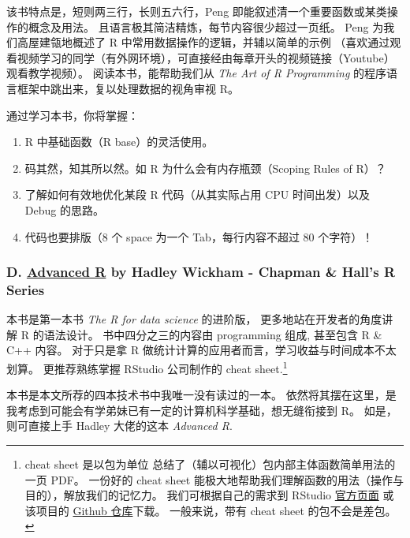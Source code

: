 \documentclass[11pt,hyperref]{ctexart}
\begin{document}
该书特点是，短则两三行，长则五六行，Peng
即能叙述清一个重要函数或某类操作的概念及用法。
且语言极其简洁精炼，每节内容很少超过一页纸。 Peng 为我们高屋建瓴地概述了
R 中常用数据操作的逻辑，并辅以简单的示例
（喜欢通过观看视频学习的同学（有外网环境），可直接经由每章开头的视频链接（Youtube）观看教学视频）。
阅读本书，能帮助我们从 \emph{The Art of R Programming}
的程序语言框架中跳出来，复以处理数据的视角审视 R。

通过学习本书，你将掌握：

\begin{enumerate}
\def\labelenumi{\arabic{enumi}.}
\item
  R 中基础函数（R base）的灵活使用。
\item
  码其然，知其所以然。如 R 为什么会有内存瓶颈（Scoping Rules of R）？
\item
  了解如何有效地优化某段 R 代码（从其实际占用 CPU 时间出发）以及 Debug
  的思路。
\item
  代码也要排版（8 个 space 为一个 Tab，每行内容不超过 80 个字符）！
\end{enumerate}

\hypertarget{d.-advanced-r-by-hadley-wickham---chapman-halls-r-series}{%
\subsubsection{\texorpdfstring{D.
\href{https://adv-r.hadley.nz/}{Advanced R} by Hadley Wickham - Chapman
\& Hall's R
Series}{D. Advanced R by Hadley Wickham - Chapman \& Hall's R Series}}\label{d.-advanced-r-by-hadley-wickham---chapman-halls-r-series}}

本书是第一本书 \emph{The R for data science} 的进阶版，
更多地站在开发者的角度讲解 R 的语法设计。 书中四分之三的内容由
programming 组成, 甚至包含 R \& C++ 内容。 对于只是拿 R
做统计计算的应用者而言，学习收益与时间成本不太划算。 更推荐熟练掌握
RStudio 公司制作的 cheat sheet.\footnote{cheat sheet 是以包为单位
  总结了（辅以可视化）包内部主体函数简单用法的一页 PDF。 一份好的 cheat
  sheet 能极大地帮助我们理解函数的用法（操作与目的），解放我们的记忆力。
  我们可根据自己的需求到 RStudio
  \href{https://rstudio.com/resources/cheatsheets/}{官方页面} 或该项目的
  \href{https://github.com/rstudio/cheatsheets}{Github 仓库}下载。
  一般来说，带有 cheat sheet 的包不会是差包。}

本书是本文所荐的四本技术书中我唯一没有读过的一本。
依然将其摆在这里，是我考虑到可能会有学弟妹已有一定的计算机科学基础，想无缝衔接到
R。 如是，则可直接上手 Hadley 大佬的这本 \emph{Advanced R}.
\end{document}
